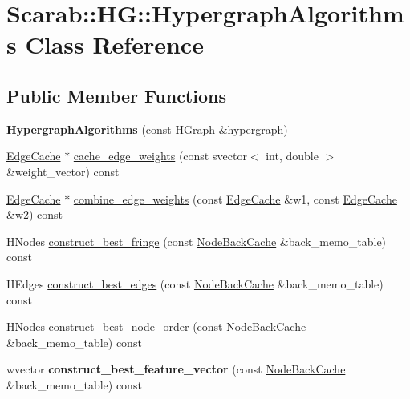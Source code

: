 \hypertarget{class_scarab_1_1_h_g_1_1_hypergraph_algorithms}{
\section{Scarab::HG::HypergraphAlgorithms Class Reference}
\label{class_scarab_1_1_h_g_1_1_hypergraph_algorithms}
}
\subsection*{Public Member Functions}
\begin{DoxyCompactItemize}
\item 
\hypertarget{class_scarab_1_1_h_g_1_1_hypergraph_algorithms_a71e2da9111a9a484e5ef370991fdb6aa}{
{\bfseries HypergraphAlgorithms} (const \hyperlink{class_scarab_1_1_h_g_1_1_h_graph}{HGraph} \&hypergraph)}
\label{class_scarab_1_1_h_g_1_1_hypergraph_algorithms_a71e2da9111a9a484e5ef370991fdb6aa}

\item 
\hyperlink{class_cache}{EdgeCache} $\ast$ \hyperlink{class_scarab_1_1_h_g_1_1_hypergraph_algorithms_a28f83d7616f6153ca7c909fe82c5b0fa}{cache\_\-edge\_\-weights} (const svector$<$ int, double $>$ \&weight\_\-vector) const 
\item 
\hyperlink{class_cache}{EdgeCache} $\ast$ \hyperlink{class_scarab_1_1_h_g_1_1_hypergraph_algorithms_ae815dc19968e9ab557d19dd2563fca38}{combine\_\-edge\_\-weights} (const \hyperlink{class_cache}{EdgeCache} \&w1, const \hyperlink{class_cache}{EdgeCache} \&w2) const 
\item 
HNodes \hyperlink{class_scarab_1_1_h_g_1_1_hypergraph_algorithms_af5bcb325e1d58dd9d4c26517c4dfeca0}{construct\_\-best\_\-fringe} (const \hyperlink{class_cache}{NodeBackCache} \&back\_\-memo\_\-table) const 
\item 
HEdges \hyperlink{class_scarab_1_1_h_g_1_1_hypergraph_algorithms_ab054762a5d6a0af7ee667c8e90585668}{construct\_\-best\_\-edges} (const \hyperlink{class_cache}{NodeBackCache} \&back\_\-memo\_\-table) const 
\item 
HNodes \hyperlink{class_scarab_1_1_h_g_1_1_hypergraph_algorithms_acf3eea6f89752404f12c0a3dd45d397d}{construct\_\-best\_\-node\_\-order} (const \hyperlink{class_cache}{NodeBackCache} \&back\_\-memo\_\-table) const 
\item 
\hypertarget{class_scarab_1_1_h_g_1_1_hypergraph_algorithms_a4ff84fd293173b5cee2f902a3509a5c2}{
wvector {\bfseries construct\_\-best\_\-feature\_\-vector} (const \hyperlink{class_cache}{NodeBackCache} \&back\_\-memo\_\-table) const }
\label{class_scarab_1_1_h_g_1_1_hypergraph_algorithms_a4ff84fd293173b5cee2f902a3509a5c2}


\end{DoxyCompactItemize}
